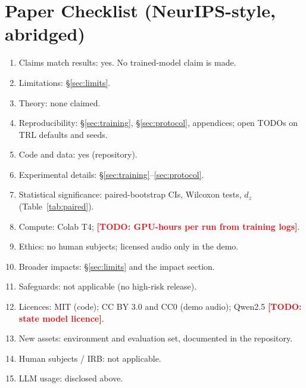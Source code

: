 \documentclass[11pt]{article}
\newcommand{\todo}[1]{\textcolor{red}{\textbf{[TODO: #1]}}}
\begin{document}
\section{Paper Checklist (NeurIPS-style, abridged)}
\begin{enumerate}[leftmargin=*,itemsep=1pt]
  \item Claims match results: yes. No trained-model claim is made.
  \item Limitations: \S\ref{sec:limits}.
  \item Theory: none claimed.
  \item Reproducibility: \S\ref{sec:training}, \S\ref{sec:protocol}, appendices; open TODOs on TRL defaults and seeds.
  \item Code and data: yes (repository).
  \item Experimental details: \S\ref{sec:training}--\ref{sec:protocol}.
  \item Statistical significance: paired-bootstrap CIs, Wilcoxon tests, $d_z$ (Table~\ref{tab:paired}).
  \item Compute: Colab T4; \todo{GPU-hours per run from training logs}.
  \item Ethics: no human subjects; licensed audio only in the demo.
  \item Broader impacts: \S\ref{sec:limits} and the impact section.
  \item Safeguards: not applicable (no high-risk release).
  \item Licences: MIT (code); CC BY 3.0 and CC0 (demo audio); Qwen2.5 \todo{state model licence}.
  \item New assets: environment and evaluation set, documented in the repository.
  \item Human subjects / IRB: not applicable.
  \item LLM usage: disclosed above.
\end{enumerate}
\end{document}
